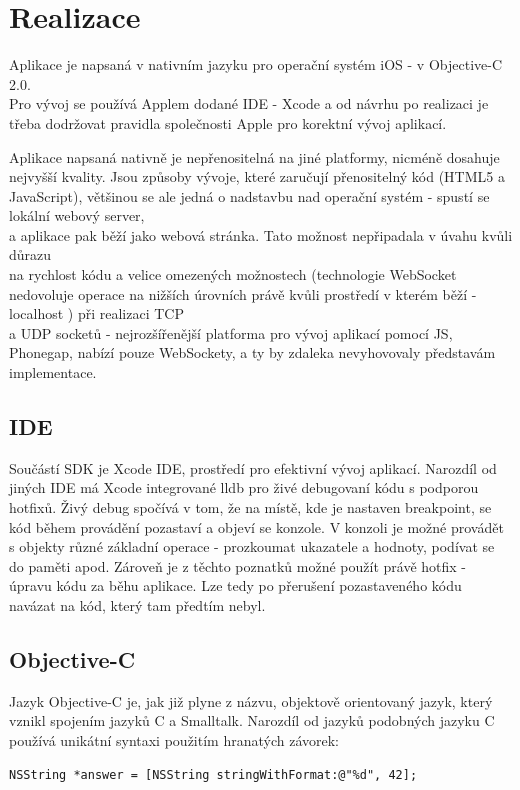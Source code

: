 \chapter{Realizace}
Aplikace je napsaná v nativním jazyku pro operační systém iOS - v Objective-C 2.0. \\Pro vývoj se používá Applem dodané IDE - Xcode a od návrhu po realizaci je třeba dodržovat pravidla společnosti Apple pro korektní vývoj aplikací. 

Aplikace napsaná nativně je nepřenositelná na jiné platformy, nicméně dosahuje nejvyšší kvality. Jsou způsoby vývoje, které zaručují přenositelný kód (HTML5 a JavaScript), většinou se ale jedná o nadstavbu nad operační systém - spustí se lokální webový server, \\a aplikace pak běží jako webová stránka. Tato možnost nepřipadala v úvahu kvůli důrazu \\na rychlost kódu a velice omezených možnostech (technologie WebSocket nedovoluje operace na nižších úrovních právě kvůli prostředí v kterém běží - localhost \cite{TIWS}) při realizaci TCP \\a UDP socketů - nejrozšířenější platforma pro vývoj aplikací pomocí JS, Phonegap, nabízí pouze WebSockety, a ty by zdaleka nevyhovovaly představám implementace.

\section{IDE}
Součástí SDK je Xcode IDE, prostředí pro efektivní vývoj aplikací. Narozdíl od jiných IDE má Xcode integrované lldb pro živé debugovaní kódu s podporou hotfixů. Živý debug spočívá v tom, že na místě, kde je nastaven breakpoint, se kód během provádění pozastaví a objeví se konzole. V konzoli je možné provádět s objekty různé základní operace - prozkoumat ukazatele a hodnoty, podívat se do paměti apod. Zároveň je z těchto poznatků možné použít právě hotfix - úpravu kódu za běhu aplikace. Lze tedy po přerušení pozastaveného kódu navázat na kód, který tam předtím nebyl.

\section{Objective-C}
Jazyk Objective-C je, jak již plyne z názvu, objektově orientovaný jazyk, který vznikl spojením jazyků C a Smalltalk. Narozdíl od jazyků podobných jazyku C používá unikátní syntaxi použitím hranatých závorek:

\begin{lstlisting}
NSString *answer = [NSString stringWithFormat:@"%d", 42];
\end{lstlisting}

